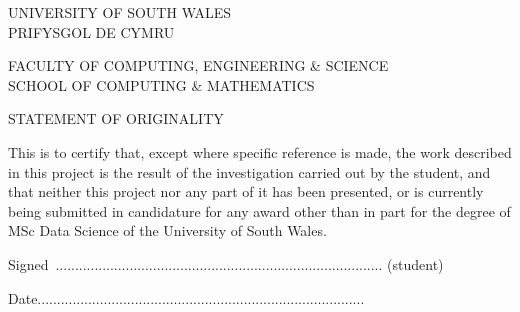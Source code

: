 \thispagestyle{empty}

\begin{center}
{\bf{UNIVERSITY OF SOUTH WALES\\
PRIFYSGOL DE CYMRU\\
\vspace*{10mm}

FACULTY OF COMPUTING, ENGINEERING \& SCIENCE\\
SCHOOL OF COMPUTING \& MATHEMATICS}}
\vspace*{20mm}

STATEMENT OF ORIGINALITY
\end{center}

This is to certify that, except where specific reference is made, the work described in this project is the result of the investigation carried out by the student, and that neither this project nor any part of it has been presented, or is currently being submitted in candidature for any award other than in part for the degree of MSc Data Science of the University of South Wales.
\vspace*{45mm}

Signed\quad~.................................................................................... (student)
\vspace*{5mm}

Date\quad\quad ....................................................................................
\vspace{15mm}

\newpage